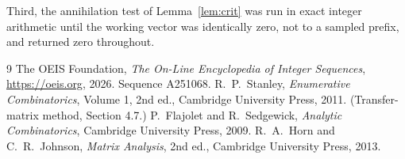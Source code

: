 \documentclass[11pt,a4paper]{article}
\theoremstyle{plain}
\theoremstyle{definition}
\begin{document}
Third, the annihilation test of Lemma~\ref{lem:crit} was run in exact integer arithmetic
until the working vector was identically zero, not to a sampled prefix, and returned zero
throughout.

\begin{thebibliography}{9}
 The OEIS Foundation, \emph{The On-Line Encyclopedia of Integer
Sequences}, \url{https://oeis.org}, 2026. Sequence A251068.
 R.~P.~Stanley, \emph{Enumerative Combinatorics}, Volume 1, 2nd ed.,
Cambridge University Press, 2011. (Transfer-matrix method, Section 4.7.)
 P.~Flajolet and R.~Sedgewick, \emph{Analytic Combinatorics}, Cambridge
University Press, 2009.
 R.~A.~Horn and C.~R.~Johnson, \emph{Matrix Analysis}, 2nd ed., Cambridge
University Press, 2013.
\end{thebibliography}
\end{document}
